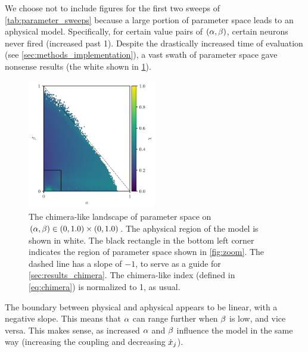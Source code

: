 We choose not to include figures for the first two sweeps of \cref{tab:parameter_sweeps} because a large portion of parameter space leads to an aphysical model.
Specifically, for certain value pairs of $\pqty{\hra, \hrb}$, certain neurons never fired (increased past 1).
Despite the drastically increased time of evaluation (see \cref{sec:methods_implementation}), a vast swath of parameter space gave nonsense results (the white shown in \cref{fig:aphysical_chimera}).
\begin{figure}[ht]
  \centering
  \includegraphics[width=0.5\textwidth]{figure/aphysical_chimera_100dpi.pdf}
  \caption[Chimera-like index landscape]{
    The chimera-like landscape of parameter space on $\pqty{\hra, \hrb} \in \pqty{0, 1.0} \times \pqty{0, 1.0}$.
    The aphysical region of the model is shown in white.
    The black rectangle in the bottom left corner indicates the region of parameter space shown in \cref{fig:zoom}.
    The dashed line has a slope of $-1$, to serve as a guide for \cref{sec:results_chimera}.
    The chimera-like index (defined in \cref{eq:chimera}) is normalized to 1, as usual.
  }
  \label{fig:aphysical_chimera}
\end{figure}
The boundary between physical and aphysical appears to be linear, with a negative slope.
This means that $\alpha$ can range further when $\beta$ is low,
and vice versa.
This makes sense, as increased $\alpha$ and $\beta$ influence the model in the same way (increasing the coupling and decreasing $\dot{x}_{j}$).

